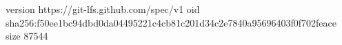 version https://git-lfs.github.com/spec/v1
oid sha256:f50ee1bc94dbd0da04495221c4cb81c201d34c2e7840a95696403f0f702feace
size 87544
